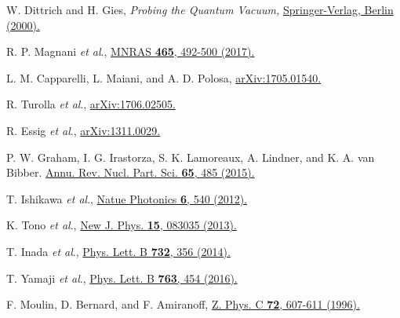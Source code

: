 \documentclass[10pt,a4paper]{article}%
\begin{document}
\begin{thebibliography}{999}
W. Dittrich and H. Gies,
{\em Probing the Quantum Vacuum,}
\href{https://doi.org/10.1007/3-540-45585-X}
{Springer-Verlag, Berlin (2000).}

R. P. Magnani {\it et al}.,
\href{https://doi.org/10.1093/mnras/stw2798}
{MNRAS {\bf 465}, 492-500 (2017).}

L. M. Capparelli, L. Maiani, and A. D. Polosa,
\href{https://arxiv.org/abs/1705.01540}
{arXiv:1705.01540.}

R. Turolla {\it et al}.,
\href{https://arxiv.org/abs/1706.02505}
{arXiv:1706.02505.}

R. Essig {\it et al}.,
\href{https://arxiv.org/abs/1311.0029}
{arXiv:1311.0029.}

P. W. Graham, I. G. Irastorza, S. K. Lamoreaux, A. Lindner, and K. A. van Bibber.
\href{https://doi.org/10.1146/annurev-nucl-102014-022120 }
{Annu. Rev. Nucl. Part. Sci. {\bf 65}, 485 (2015).}

T. Ishikawa {\it et al}.,
\href{https://doi.org/10.1038/nphoton.2012.141}
{Natue Photonics {\bf 6}, 540 (2012).}

K. Tono {\it et al}.,
\href{https://doi.org/10.1088/1367-2630/15/8/083035}
{New J. Phys. {\bf 15}, 083035 (2013).}

T. Inada {\it et al}.,
\href{http://doi.org/10.1016/j.physletb.2014.03.054}
{Phys. Lett. B {\bf 732}, 356 (2014).}

T. Yamaji {\it et al}.,
\href{http://doi.org/10.1016/j.physletb.2016.11.003}
{Phys. Lett. B {\bf 763}, 454 (2016).}

F. Moulin, D. Bernard, and F. Amiranoff,
\href{http://doi.org/10.1007/s002880050282}
{Z. Phys. C {\bf 72}, 607-611 (1996).}


\end{thebibliography}
\end{document}

